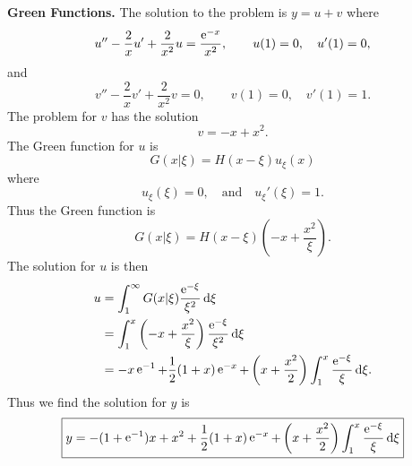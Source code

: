 {\begin{Solution}
  \textbf{Green Functions.}
  The solution to the problem is $y=u+v$ where 
  \[
  u'' - \frac{2}{x} u' + \frac{2}{x^2} u = \frac{\mathop{\mathrm{e}}\nolimits^{-x}}{x^2}, \qquad
  u(1)=0, \quad u'(1)=0,
  \]
  and
  \[
  v'' - \frac{2}{x} v' + \frac{2}{x^2} v = 0, \qquad v(1)=0, \quad v'(1)=1.
  \]
  The problem for $v$ has the solution
  \[
  v = -x + x^2.
  \]
  The Green function for $u$ is
  \[
  G(x|\xi) = H(x-\xi) u_\xi(x)
  \]
  where
  \[
  u_\xi(\xi) = 0, \quad \mathrm{and} \quad u_\xi'(\xi)=1.
  \]
  Thus the Green function is
  \[
  G(x|\xi) = H(x-\xi) \left(-x + \frac{x^2}{\xi} \right).
  \]
  The solution for $u$ is then
  \begin{align*}
    u       &= \int_1^\infty G(x|\xi) \frac{\mathop{\mathrm{e}}\nolimits^{-\xi}}{\xi^2} \,\mathrm{d} \xi \\
    &= \int_1^x \left(-x + \frac{x^2}{\xi} \right) 
    \frac{\mathop{\mathrm{e}}\nolimits^{-\xi}}{\xi^2} \,\mathrm{d} \xi \\
    &= -x \mathop{\mathrm{e}}\nolimits^{-1} + \frac{1}{2}(1+x)\mathop{\mathrm{e}}\nolimits^{-x} + \left(x+\frac{x^2}{2}\right)
    \int_1^x \frac{\mathop{\mathrm{e}}\nolimits^{-\xi}}{\xi} \,\mathrm{d} \xi.
  \end{align*}
  Thus we find the solution for $y$ is
  \[ 
  \boxed{ 
    y = -(1+\mathop{\mathrm{e}}\nolimits^{-1})x + x^2 + \frac{1}{2} (1+x) \mathop{\mathrm{e}}\nolimits^{-x} 
    + \left(x+\frac{x^2}{2}\right) \int_1^x \frac{\mathop{\mathrm{e}}\nolimits^{-\xi}}{\xi} \,\mathrm{d} \xi
    }
  \]
\end{Solution}





}
